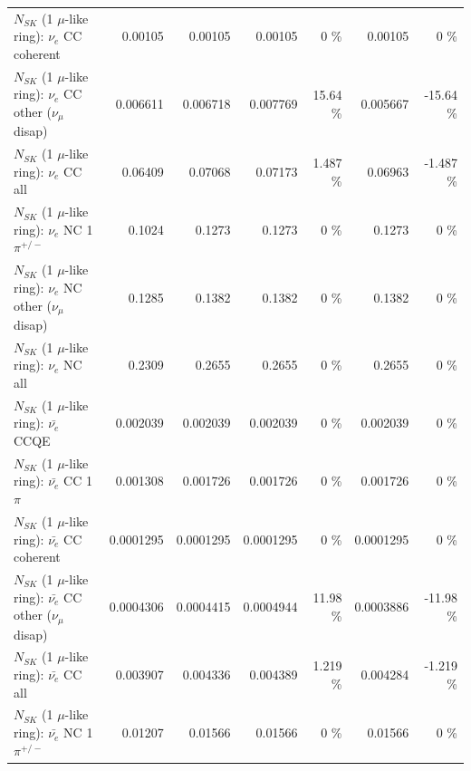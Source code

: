 \begin{table}
\begin{tabular}{| l | r | r | r  r | r  r |}
                               $N_{SK}$ (1 $\mu$-like ring): $\nu_e$ CC coherent &         0.00105 &         0.00105 &         0.00105 &        0 \%  &         0.00105 &        0 \%  \\ 
                $N_{SK}$ (1 $\mu$-like ring): $\nu_e$ CC other ($\nu_\mu$ disap) &        0.006611 &        0.006718 &        0.007769 &    15.64 \%  &        0.005667 &   -15.64 \%  \\ 
                                  $N_{SK}$ (1 $\mu$-like ring): $\nu_{e}$ CC all &         0.06409 &         0.07068 &         0.07173 &    1.487 \%  &         0.06963 &   -1.487 \%  \\ 
\hline
                           $N_{SK}$ (1 $\mu$-like ring): $\nu_e$ NC 1$\pi^{+/-}$ &          0.1024 &          0.1273 &          0.1273 &        0 \%  &          0.1273 &        0 \%  \\ 
                $N_{SK}$ (1 $\mu$-like ring): $\nu_e$ NC other ($\nu_\mu$ disap) &          0.1285 &          0.1382 &          0.1382 &        0 \%  &          0.1382 &        0 \%  \\ 
                                  $N_{SK}$ (1 $\mu$-like ring): $\nu_{e}$ NC all &          0.2309 &          0.2655 &          0.2655 &        0 \%  &          0.2655 &        0 \%  \\ 
\hline
\hline
\hline
                                $N_{SK}$ (1 $\mu$-like ring): $\bar{\nu_e}$ CCQE &        0.002039 &        0.002039 &        0.002039 &        0 \%  &        0.002039 &        0 \%  \\ 
                           $N_{SK}$ (1 $\mu$-like ring): $\bar{\nu_e}$ CC 1$\pi$ &        0.001308 &        0.001726 &        0.001726 &        0 \%  &        0.001726 &        0 \%  \\ 
                         $N_{SK}$ (1 $\mu$-like ring): $\bar{\nu_e}$ CC coherent &       0.0001295 &       0.0001295 &       0.0001295 &        0 \%  &       0.0001295 &        0 \%  \\ 
          $N_{SK}$ (1 $\mu$-like ring): $\bar{\nu_e}$ CC other ($\nu_\mu$ disap) &       0.0004306 &       0.0004415 &       0.0004944 &    11.98 \%  &       0.0003886 &   -11.98 \%  \\ 
                            $N_{SK}$ (1 $\mu$-like ring): $\bar{\nu_{e}}$ CC all &        0.003907 &        0.004336 &        0.004389 &    1.219 \%  &        0.004284 &   -1.219 \%  \\ 
\hline
                     $N_{SK}$ (1 $\mu$-like ring): $\bar{\nu_e}$ NC 1$\pi^{+/-}$ &         0.01207 &         0.01566 &         0.01566 &        0 \%  &         0.01566 &        0 \%  \\ 

\end{tabular}
\end{table}
